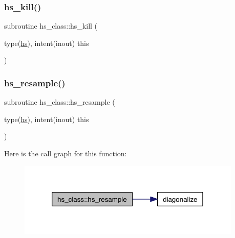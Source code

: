 \subsubsection{\texorpdfstring{hs\+\_\+kill()}{hs\_kill()}}
{\footnotesize\ttfamily subroutine hs\+\_\+class\+::hs\+\_\+kill (\begin{DoxyParamCaption}\item[{type(\hyperlink{strucths__class_1_1hs}{hs}), intent(inout)}]{this }\end{DoxyParamCaption})\hspace{0.3cm}{\ttfamily [private]}}

\mbox{\label{namespacehs__class_abf39e51fc1d47061279287a7e328d9d4}} 
\subsubsection{\texorpdfstring{hs\+\_\+resample()}{hs\_resample()}}
{\footnotesize\ttfamily subroutine hs\+\_\+class\+::hs\+\_\+resample (\begin{DoxyParamCaption}\item[{type(\hyperlink{strucths__class_1_1hs}{hs}), intent(inout)}]{this }\end{DoxyParamCaption})\hspace{0.3cm}{\ttfamily [private]}}

Here is the call graph for this function\+:\nopagebreak
\begin{figure}[H]
\begin{center}
\leavevmode
\includegraphics[width=302pt]{namespacehs__class_abf39e51fc1d47061279287a7e328d9d4_cgraph}
\end{center}
\end{figure}
\mbox{\label{namespacehs__class_a3b78604825b27d4d06a70aac14b8c538}} 
